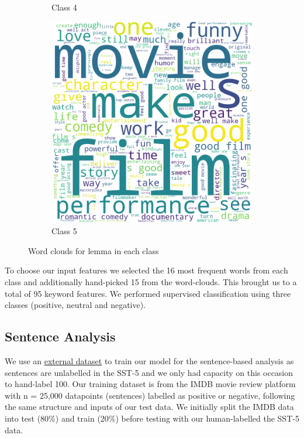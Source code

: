\documentclass[10pt, a4paper]{article}
\begin{document}
\begin{figure}[h]
\begin{subfigure}[b]{0.18\textwidth}
         \caption{Class 4}
         \label{fig:lemma4cloud}
     \end{subfigure}
     \hfill
     \begin{subfigure}[b]{0.18\textwidth}
         \centering
         \includegraphics[width=\textwidth]{lemma5.png}
         \caption{Class 5}
         \label{fig:lemma5cloud}
     \end{subfigure}
     \hfill
    \caption{Word clouds for lemma in each class}
\label{fig:lemmacloud}
\end{figure}

To choose our input features we selected the 16 most frequent words from each class and additionally hand-picked 15 from the word-clouds. This brought us to a total of 95 keyword features. We performed supervised classification using three classes (positive, neutral and negative).


\subsection{Sentence Analysis}
We use an \href{http://ai.stanford.edu/~amaas/data/sentiment/}{external dataset} \cite{maas2011learning} to train our model for the sentence-based analysis as sentences are unlabelled in the SST-5 and we only had capacity on this occasion to hand-label 100. Our training dataset is from the IMDB movie review platform with n = 25,000 datapoints (sentences) labelled as positive or negative, following the same structure and inputs of our test data. We initially split the IMDB data into test (80\%) and train (20\%) before testing with our human-labelled the SST-5 data.
\end{document}
